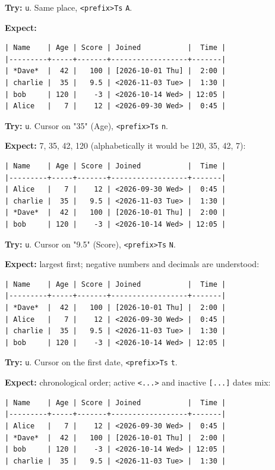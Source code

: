 \textbf{Try:} \texttt{u}. Same place, \texttt{<prefix>Ts} \texttt{A}.

\textbf{Expect:}
\begin{verbatim}
| Name    | Age | Score | Joined           |  Time |
|---------+-----+-------+------------------+-------|
| *Dave*  |  42 |   100 | [2026-10-01 Thu] |  2:00 |
| charlie |  35 |   9.5 | <2026-11-03 Tue> |  1:30 |
| bob     | 120 |    -3 | <2026-10-14 Wed> | 12:05 |
| Alice   |   7 |    12 | <2026-09-30 Wed> |  0:45 |
\end{verbatim}

\textbf{Try:} \texttt{u}. Cursor on "35" (Age), \texttt{<prefix>Ts} \texttt{n}.

\textbf{Expect:} 7, 35, 42, 120 (alphabetically it would be 120, 35, 42, 7):
\begin{verbatim}
| Name    | Age | Score | Joined           |  Time |
|---------+-----+-------+------------------+-------|
| Alice   |   7 |    12 | <2026-09-30 Wed> |  0:45 |
| charlie |  35 |   9.5 | <2026-11-03 Tue> |  1:30 |
| *Dave*  |  42 |   100 | [2026-10-01 Thu] |  2:00 |
| bob     | 120 |    -3 | <2026-10-14 Wed> | 12:05 |
\end{verbatim}

\textbf{Try:} \texttt{u}. Cursor on "9.5" (Score), \texttt{<prefix>Ts} \texttt{N}.

\textbf{Expect:} largest first; negative numbers and decimals are understood:
\begin{verbatim}
| Name    | Age | Score | Joined           |  Time |
|---------+-----+-------+------------------+-------|
| *Dave*  |  42 |   100 | [2026-10-01 Thu] |  2:00 |
| Alice   |   7 |    12 | <2026-09-30 Wed> |  0:45 |
| charlie |  35 |   9.5 | <2026-11-03 Tue> |  1:30 |
| bob     | 120 |    -3 | <2026-10-14 Wed> | 12:05 |
\end{verbatim}

\textbf{Try:} \texttt{u}. Cursor on the first date, \texttt{<prefix>Ts} \texttt{t}.

\textbf{Expect:} chronological order; active \texttt{<...>} and inactive \texttt{[...]} dates
mix:
\begin{verbatim}
| Name    | Age | Score | Joined           |  Time |
|---------+-----+-------+------------------+-------|
| Alice   |   7 |    12 | <2026-09-30 Wed> |  0:45 |
| *Dave*  |  42 |   100 | [2026-10-01 Thu] |  2:00 |
| bob     | 120 |    -3 | <2026-10-14 Wed> | 12:05 |
| charlie |  35 |   9.5 | <2026-11-03 Tue> |  1:30 |
\end{verbatim}

